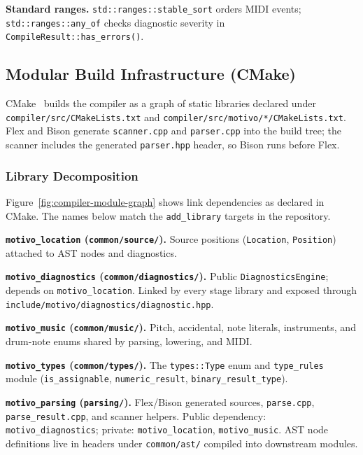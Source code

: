 \noindent \textbf{Standard ranges.} \texttt{std::ranges::stable\_sort} orders MIDI events; \texttt{std::ranges::any\_of}
checks diagnostic severity in \texttt{CompileResult::has\_errors()}.

\subsection{Modular Build Infrastructure (CMake)}\label{detail-subsec:modular-build-infrastructure-(cmake)}

CMake~\cite{CMake_2026} builds the compiler as a graph of static libraries declared under
\texttt{compiler/src/CMakeLists.txt} and \texttt{compiler/src/motivo/*/CMakeLists.txt}.
Flex and Bison generate \texttt{scanner.cpp} and \texttt{parser.cpp} into the build tree; the scanner includes the
generated \texttt{parser.hpp} header, so Bison runs before Flex.

\subsubsection{Library Decomposition}

Figure~\ref{fig:compiler-module-graph} shows link dependencies as declared in CMake.
The names below match the \texttt{add\_library} targets in the repository.

\noindent \textbf{\texttt{motivo\_location} (\texttt{common/source/}).} Source positions (\texttt{Location},
\texttt{Position}) attached to AST nodes and diagnostics.

\noindent \textbf{\texttt{motivo\_diagnostics} (\texttt{common/diagnostics/}).} Public
\texttt{DiagnosticsEngine}; depends
on \texttt{motivo\_location}.
Linked by every stage library and exposed through \texttt{include/motivo/diagnostics/diagnostic.hpp}.

\noindent \textbf{\texttt{motivo\_music} (\texttt{common/music/}).} Pitch, accidental, note literals, instruments, and
drum-note enums shared by parsing, lowering, and MIDI.

\noindent \textbf{\texttt{motivo\_types} (\texttt{common/types/}).} The \texttt{types::Type} enum and
\texttt{type\_rules} module (\texttt{is\_assignable}, \texttt{numeric\_result}, \texttt{binary\_result\_type}).

\noindent \textbf{\texttt{motivo\_parsing} (\texttt{parsing/}).} Flex/Bison generated sources, \texttt{parse.cpp},
\texttt{parse\_result.cpp}, and scanner helpers.
Public dependency: \texttt{motivo\_diagnostics}; private: \texttt{motivo\_location}, \texttt{motivo\_music}.
AST node definitions live in headers under \texttt{common/ast/} compiled into downstream modules.

